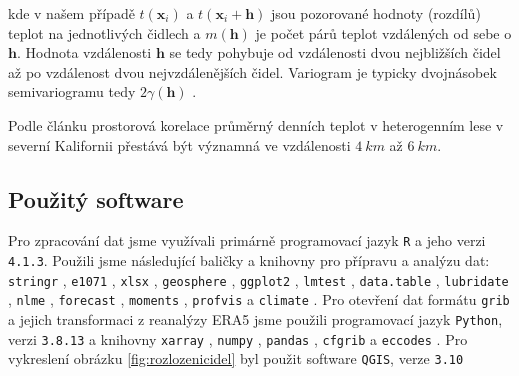 kde v našem případě $t(\mathbf{x}_i)$ a $t(\mathbf{x}_i+\mathbf{h})$ jsou pozorované hodnoty (rozdílů) teplot na jednotlivých čidlech a $m(\mathbf{h})$ je počet párů teplot vzdálených od sebe o $\mathbf{h}$. Hodnota vzdálenosti $\mathbf{h}$ se tedy pohybuje od vzdálenosti dvou nejbližších čidel až po vzdálenost dvou nejvzdálenějších čidel. Variogram je typicky dvojnásobek semivariogramu tedy $2\gamma(\mathbf{h})$ \parencite{variogram}.

Podle článku \parencite{predictingforestmicroclimate} prostorová korelace průměrný denních teplot v heterogenním lese v severní Kalifornii přestává být významná ve vzdálenosti $\SI{4}{km}$ až $\SI{6}{km}$.

\subsection{Použitý software}
Pro zpracování dat jsme využívali primárně programovací jazyk \texttt{R} \parencite{Rlanguage} a jeho verzi \texttt{4.1.3}. Použili jsme následující baličky a knihovny pro přípravu a analýzu dat: \texttt{stringr} \parencite{stringr}, \texttt{e1071} \parencite{e1071}, \texttt{xlsx} \parencite{xlsx}, \texttt{geosphere} \parencite{geosphere}, \texttt{ggplot2} \parencite{ggplot2}, \texttt{lmtest} \parencite{lmtest}, \texttt{data.table} \parencite{data.table}, \texttt{lubridate} \parencite{lubridate}, \texttt{nlme} \parencite{nlme}, \texttt{forecast} \parencite{forecast}, \texttt{moments} \parencite{moments}, \texttt{profvis} \parencite{profvis} a \texttt{climate} \parencite{climate}. Pro otevření dat formátu \texttt{grib} a jejich transformaci z reanalýzy ERA5 jsme použili programovací jazyk \texttt{Python}, verzi \texttt{3.8.13} \parencite{python} a knihovny \texttt{xarray} \parencite{xarray}, \texttt{numpy} \parencite{numpy}, \texttt{pandas} \parencite{pandas}, \texttt{cfgrib} \parencite{cfgrib} a \texttt{eccodes} \parencite{eccodes}. Pro vykreslení obrázku \ref{fig:rozlozenicidel} byl použit software \texttt{QGIS}, verze \texttt{3.10} \parencite{qgis}
